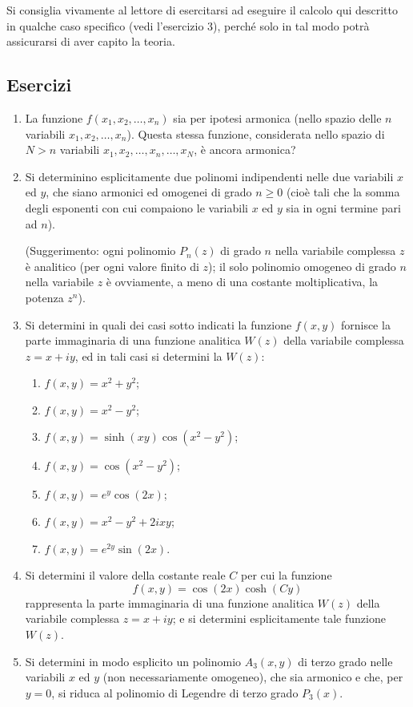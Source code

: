 \documentclass[11pt, a4paper]{book}
\numberwithin{equation}{section}
\newenvironment{esercizi}{\subsection*{Esercizi}\begin{enumerate}}{\end{enumerate}}
\begin{document}
Si consiglia vivamente al lettore di esercitarsi ad eseguire il calcolo qui descritto in qualche caso specifico (vedi l'esercizio 3), perché solo in tal modo potrà assicurarsi di aver capito la teoria.

\begin{esercizi}
\item La funzione $f(x_1, x_2, \ldots, x_n)$ sia per ipotesi armonica (nello spazio delle $n$ variabili $x_1, x_2, \ldots, x_n$). Questa stessa funzione, considerata nello spazio di $N > n$ variabili $x_1, x_2, \ldots, x_n, \ldots, x_N$, è ancora armonica?

\item Si determinino esplicitamente due polinomi indipendenti nelle due variabili $x$ ed $y$, che siano armonici ed omogenei di grado $n \geq 0$ (cioè tali che la somma degli esponenti con cui compaiono le variabili $x$ ed $y$ sia in ogni termine pari ad $n$).

(Suggerimento: ogni polinomio $P_n(z)$ di grado $n$ nella variabile complessa $z$ è analitico (per ogni valore finito di $z$); il solo polinomio omogeneo di grado $n$ nella variabile $z$ è ovviamente, a meno di una costante moltiplicativa, la potenza $z^n$).

\item Si determini in quali dei casi sotto indicati la funzione $f(x,y)$ fornisce la parte immaginaria di una funzione analitica $W(z)$ della variabile complessa $z = x + iy$, ed in tali casi si determini la $W(z)$:
\begin{enumerate}
\renewcommand{\theenumi}{\roman{enumi}}
\item $f(x,y) = x^2 + y^2$;
\item $f(x,y) = x^2 - y^2$;
\item $f(x,y) = \sinh(xy)\cos(x^2 - y^2)$;


\item $f(x,y) = \cos(x^2 - y^2)$;
\item $f(x,y) = e^y\cos(2x)$;
\item $f(x,y) = x^2 - y^2 + 2ixy$;
\item $f(x,y) = e^{2y}\sin(2x)$.
\end{enumerate}

\item Si determini il valore della costante reale $C$ per cui la funzione
\[
f(x,y) = \cos(2x)\cosh(Cy)
\]
rappresenta la parte immaginaria di una funzione analitica $W(z)$ della variabile complessa $z = x + iy$; e si determini esplicitamente tale funzione $W(z)$.

\item Si determini in modo esplicito un polinomio $A_3(x,y)$ di terzo grado nelle variabili $x$ ed $y$ (non necessariamente omogeneo), che sia armonico e che, per $y = 0$, si riduca al polinomio di Legendre di terzo grado $P_3(x)$.
\end{esercizi}
\end{document}
